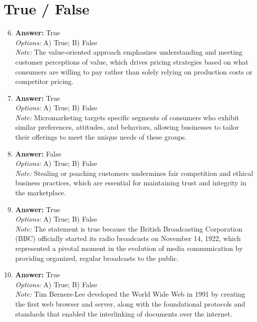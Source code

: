 \documentclass[12pt]{article}
\begin{document}
\section*{True / False}
\begin{enumerate}[label=\arabic*.]
\setcounter{enumi}{5}
\item \textbf{Answer:} True
\\ \textit{Options:} A) True; B) False
\\ \textit{Note:} The value-oriented approach emphasizes understanding and meeting customer perceptions of value, which drives pricing strategies based on what consumers are willing to pay rather than solely relying on production costs or competitor pricing.
\item \textbf{Answer:} True
\\ \textit{Options:} A) True; B) False
\\ \textit{Note:} Micromarketing targets specific segments of consumers who exhibit similar preferences, attitudes, and behaviors, allowing businesses to tailor their offerings to meet the unique needs of these groups.
\item \textbf{Answer:} False
\\ \textit{Options:} A) True; B) False
\\ \textit{Note:} Stealing or poaching customers undermines fair competition and ethical business practices, which are essential for maintaining trust and integrity in the marketplace.
\item \textbf{Answer:} True
\\ \textit{Options:} A) True; B) False
\\ \textit{Note:} The statement is true because the British Broadcasting Corporation (BBC) officially started its radio broadcasts on November 14, 1922, which represented a pivotal moment in the evolution of media communication by providing organized, regular broadcasts to the public.
\item \textbf{Answer:} True
\\ \textit{Options:} A) True; B) False
\\ \textit{Note:} Tim Berners-Lee developed the World Wide Web in 1991 by creating the first web browser and server, along with the foundational protocols and standards that enabled the interlinking of documents over the internet.
\end{enumerate}
\end{document}
